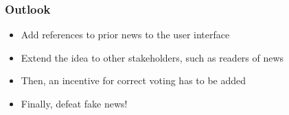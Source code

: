 \documentclass[aspectratio=169]{beamer}
\begin{document}
\begin{frame}
\frametitle{Outlook}

\begin{minipage}[6cm]{7cm}
\begin{itemize}
\item Add references to prior news to the user interface
\item Extend the idea to other stakeholders, such as readers of news
\item Then, an incentive for correct voting has to be added
\item Finally, defeat fake news!
\end{itemize}
\end{minipage}
\hfill
\begin{minipage}[5cm]{6cm}
\end{minipage}
\end{frame}
\end{document}
